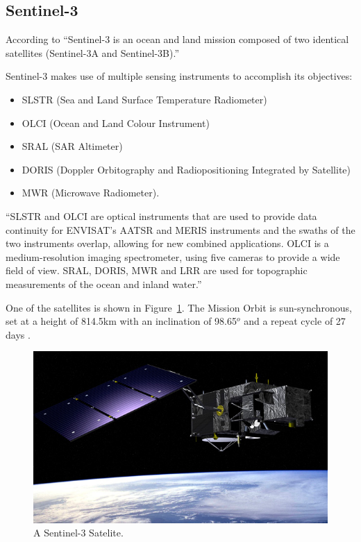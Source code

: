 \documentclass[sigplan,screen]{acmart}
\begin{document}
\subsection{Sentinel-3}

According to \cite{Sentinel84:online}
``Sentinel-3 is an ocean and land mission composed of two identical satellites (Sentinel-3A and Sentinel-3B).''

Sentinel-3 makes use of multiple sensing instruments to accomplish its objectives:

\begin{itemize}
    \item SLSTR (Sea and Land Surface Temperature Radiometer)
\item OLCI (Ocean and Land Colour Instrument)
\item SRAL (SAR Altimeter)
\item DORIS (Doppler Orbitography and Radiopositioning Integrated by Satellite)
\item MWR (Microwave Radiometer).

\end{itemize}

``SLSTR and OLCI are optical instruments that are used to provide data continuity for ENVISAT's AATSR and MERIS instruments and the swaths of the two instruments overlap, allowing for new combined applications. OLCI is a medium-resolution imaging spectrometer, using five cameras to provide a wide field of view.
SRAL, DORIS, MWR and LRR are used for topographic measurements of the ocean and inland water.'' \cite{Sentinel84:online}

One of the satellites is shown in Figure~\ref{fig:sat}. The 
Mission Orbit is 
sun-synchronous, set at a height of  814.5km
with an inclination of 98.65$^{o}$ and a repeat cycle of 27 days \cite{Sentinel84:online}.


\begin{figure}[htb]
\centering\includegraphics[width=0.8\columnwidth]{images/sentinel-3.jpg}
\caption{A Sentinel-3 Satelite.}
\label{fig:sat}
\end{figure}
\end{document}
